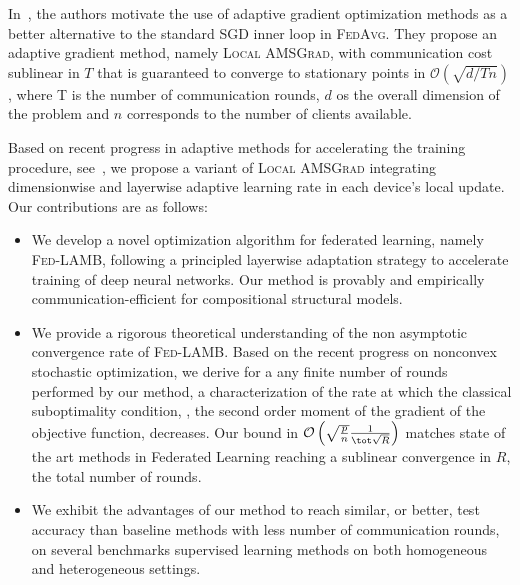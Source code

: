\documentclass[11pt]{article}
\begin{document}
In~\citep{chen2020toward}, the authors motivate the use of adaptive gradient optimization methods as a better alternative to the standard \textsc{SGD} inner loop in \textsc{FedAvg}.
They propose an adaptive gradient method, namely \textsc{Local AMSGrad}, with communication cost sublinear in $T$ that is guaranteed to converge to stationary points in $\mathcal{O}(\sqrt{d/Tn})$, where T is the number of communication rounds, $d$ os the overall dimension of the problem and $n$ corresponds to the number of clients available.

Based on recent progress in adaptive methods for accelerating the training procedure, see~\citep{you2019large}, we propose a variant of \textsc{Local AMSGrad} integrating dimensionwise and layerwise adaptive learning rate in each device's local update.
Our contributions are as follows:
\begin{itemize}
\item We develop a novel optimization algorithm for federated learning, namely \textsc{Fed-LAMB}, following a principled layerwise adaptation strategy to accelerate training of deep neural networks. Our method is provably and empirically communication-efficient for compositional structural models.
\item We provide a rigorous theoretical understanding of the non asymptotic convergence rate of \textsc{Fed-LAMB}. Based on the recent progress on nonconvex stochastic optimization, we derive for a any finite number of rounds performed by our method, a characterization of the rate at which the classical suboptimality condition, \ie, the second order moment of the gradient of the objective function, decreases. Our bound  in $\mathcal{O}\left(\sqrt{\frac{ p}{ n}} \frac{1}{\tot \sqrt{R} } \right)$ matches state of the art methods in Federated Learning reaching a sublinear convergence in $R$, the total number of rounds.
\item We exhibit the advantages of our method to reach similar, or better, test accuracy than baseline methods with less number of communication rounds, on several benchmarks supervised learning methods on both homogeneous and heterogeneous settings.
\end{itemize}

\end{document}
